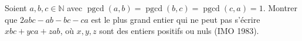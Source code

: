 Soient $a, b, c \in \mathbb{N}$ avec $\operatorname{pgcd}(a, b) = \operatorname{pgcd}(b, c) = \operatorname{pgcd}(c, a) = 1$. Montrer que $2abc - ab - bc - ca$ est le plus grand entier qui ne peut pas s'écrire $xbc + yca + zab$, où $x, y, z$ sont des entiers positifs ou nuls (IMO 1983).
